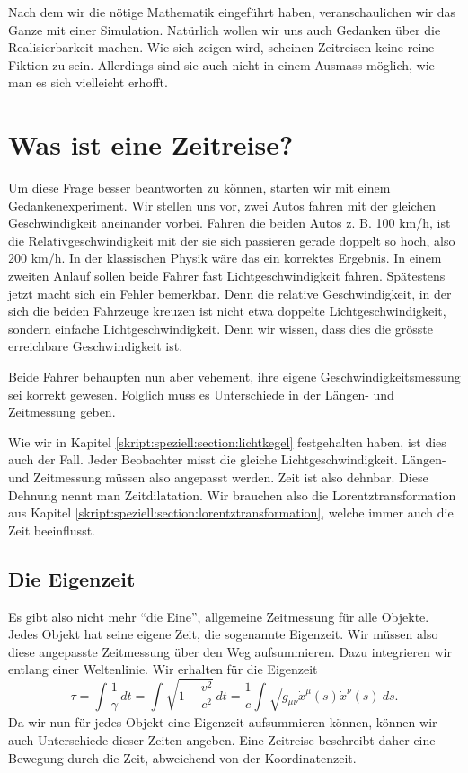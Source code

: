 \begin{refsection}
Nach dem wir die nötige Mathematik eingeführt haben, veranschaulichen wir das Ganze mit einer Simulation. Natürlich wollen wir uns auch Gedanken über die Realisierbarkeit machen. Wie sich zeigen wird, scheinen Zeitreisen keine reine Fiktion zu sein. Allerdings sind sie auch nicht in einem Ausmass möglich, wie man es sich vielleicht erhofft.

\section{Was ist eine Zeitreise?}
Um diese Frage besser beantworten zu können, starten wir mit einem Gedankenexperiment. Wir stellen uns vor, zwei Autos fahren mit der gleichen Geschwindigkeit aneinander vorbei. Fahren die beiden Autos z. B. 100 km/h, ist die Relativgeschwindigkeit mit der sie sich passieren gerade doppelt so hoch, also 200 km/h. In der klassischen Physik wäre das ein korrektes Ergebnis. In einem zweiten Anlauf sollen beide Fahrer fast Lichtgeschwindigkeit fahren. Spätestens jetzt macht sich ein Fehler bemerkbar. Denn die relative Geschwindigkeit, in der sich die beiden Fahrzeuge kreuzen ist nicht etwa doppelte Lichtgeschwindigkeit, sondern einfache Lichtgeschwindigkeit. Denn wir wissen, dass dies die grösste erreichbare Geschwindigkeit ist.

Beide Fahrer behaupten nun aber vehement, ihre eigene Geschwindigkeitsmessung sei korrekt gewesen. Folglich muss es Unterschiede in der Längen- und Zeitmessung geben.

Wie wir in Kapitel \ref{skript:speziell:section:lichtkegel} festgehalten haben, ist dies auch der Fall. Jeder Beobachter misst die gleiche Lichtgeschwindigkeit. Längen- und Zeitmessung müssen also angepasst werden. Zeit ist also dehnbar. Diese Dehnung nennt man Zeitdilatation. Wir brauchen also die Lorentztransformation aus Kapitel \ref{skript:speziell:section:lorentztransformation}, welche immer auch die Zeit beeinflusst.

\subsection{Die Eigenzeit}
Es gibt also nicht mehr ``die Eine'', allgemeine Zeitmessung für alle Objekte. Jedes Objekt hat seine eigene Zeit, die sogenannte Eigenzeit. Wir müssen also diese angepasste Zeitmessung über den Weg aufsummieren.
Dazu integrieren wir entlang einer Weltenlinie. Wir erhalten für die Eigenzeit
\begin{equation}\label{Eigenzeit}
\tau
=
\int_{}^{}\frac{1}{\gamma}\,dt=\int_{}^{}\sqrt{1-\frac{v^2}{c^2}}\,dt
=
\frac{1}{c}\int_{}^{}\sqrt{g_{\mu\nu}\dot{x}^{\mu}(s)\dot{x}^{\nu}(s)}\,ds.
\end{equation}
Da wir nun für jedes Objekt eine Eigenzeit aufsummieren können, können wir auch Unterschiede dieser Zeiten angeben.
Eine Zeitreise beschreibt daher eine Bewegung durch die Zeit, abweichend von der Koordinatenzeit.


\end{refsection}
